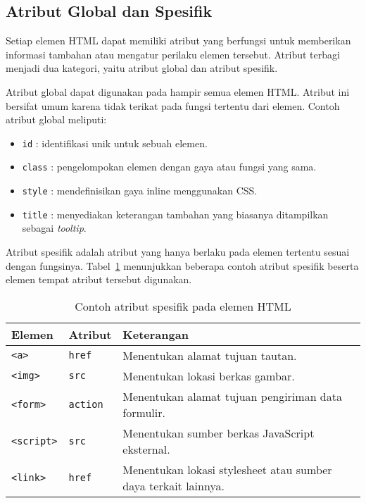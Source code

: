 \subsection{Atribut Global dan Spesifik}
\label{subsec:0224-atribut-global-dan-spesifik}

Setiap elemen HTML dapat memiliki atribut yang berfungsi untuk memberikan informasi tambahan atau mengatur perilaku elemen tersebut. Atribut terbagi menjadi dua kategori, yaitu atribut global dan atribut spesifik.

Atribut global dapat digunakan pada hampir semua elemen HTML. Atribut ini bersifat umum karena tidak terikat pada fungsi tertentu dari elemen. Contoh atribut global meliputi:
\begin{itemize}
    \item \texttt{id} : identifikasi unik untuk sebuah elemen.
    \item \texttt{class} : pengelompokan elemen dengan gaya atau fungsi yang sama.
    \item \texttt{style} : mendefinisikan gaya inline menggunakan CSS.
    \item \texttt{title} : menyediakan keterangan tambahan yang biasanya ditampilkan sebagai \textit{tooltip}.
\end{itemize}

Atribut spesifik adalah atribut yang hanya berlaku pada elemen tertentu sesuai dengan fungsinya. Tabel~\ref{tab:html-specific-attributes} menunjukkan beberapa contoh atribut spesifik beserta elemen tempat atribut tersebut digunakan.

\begin{table}[H]
\centering
\caption{Contoh atribut spesifik pada elemen HTML}
\label{tab:html-specific-attributes}
\begin{tabular}{|l|l|p{7cm}|}
\hline
\textbf{Elemen} & \textbf{Atribut} & \textbf{Keterangan} \\ \hline
\texttt{<a>} & \texttt{href} & Menentukan alamat tujuan tautan. \\ \hline
\texttt{<img>} & \texttt{src} & Menentukan lokasi berkas gambar. \\ \hline
\texttt{<form>} & \texttt{action} & Menentukan alamat tujuan pengiriman data formulir. \\ \hline
\texttt{<script>} & \texttt{src} & Menentukan sumber berkas JavaScript eksternal. \\ \hline
\texttt{<link>} & \texttt{href} & Menentukan lokasi stylesheet atau sumber daya terkait lainnya. \\ \hline
\end{tabular}
\end{table}



